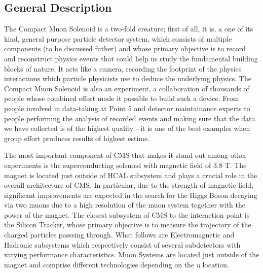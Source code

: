 \subsection{General Description} \label{subsection:higgs_cms_generaldescription}
The Compact Muon Solenoid is a two-fold creature; first of all, it is, a one of its kind, general purpose particle detector system, which consists of multiple components (to be discussed futher) and whose primary objective is to record and reconstruct physics events that could help us study the fundamental building blocks of nature. It acts like a camera, recording the footprint of the physics interactions which particle physicists use to deduce the underlying physics. The Compact Muon Solenoid is also an experiment, a collaboration of thousands of people whose combined effort made it possible to build such a device. From people involved in data-taking at Point 5 and detector maintainance experts to people performing the analysis of recorded events and making sure that the data we have collected is of the highest quality - it is one of the best examples when group effort produces results of highest estime.

The most important component of CMS that makes it stand out among other experiments is the superconducting solenoid with magnetic field of 3.8 T. The magnet is located just outside of HCAL subsystem and plays a crucial role in the overall architecture of CMS. In particular, due to the strength of magnetic field, significant improvements are expected in the search for the Higgs Boson decaying via two muons due to a high resolution of the muon system together with the power of the magnet. The closest subsystem of CMS to the interaction point is the Silicon Tracker, whose primary objective is to measure the trajectory of the charged particles passsing through. What follows are Electromagnetic and Hadronic subsystems which respectively consist of several subdetectors with varying performance characteristics. Muon Systems are located just outside of the magnet and comprise different technologies depending on the $\eta$ location.


